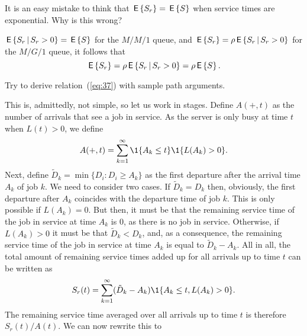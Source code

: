 \begin{question}
  It is an easy mistake to think that $\,\mathsf{E}\left\{S_r\right\} = \,\mathsf{E}\left\{S\right\}$ when service
  times are exponential. Why is this wrong?
  \begin{solution}
    $\,\mathsf{E}\left\{S_r \,\middle|\, S_r>0\right\} = \,\mathsf{E}\left\{S\right\}$ for the $M/M/1$ queue, and
    $\,\mathsf{E}\left\{S_r\right\} = \rho \,\mathsf{E}\left\{S_r \,\middle|\, S_r>0\right\}$ for the $M/G/1$ queue, it
    follows that
  \begin{equation*}
 \,\mathsf{E}\left\{S_r\right\} = \rho \,\mathsf{E}\left\{S_r\,\middle|\, S_r>0\right\} = \rho \,\mathsf{E}\left\{S\right\}.
  \end{equation*}
  \end{solution}
\end{question}

\begin{question}
  Try to derive relation~(\ref{eq:37}) with sample path
  arguments. 
  \begin{solution}
    This is, admittedly, not simple, so let us work in stages. Define
    $A(+,t)$ as the number of arrivals that see a job in service. As
    the server is only busy at time $t$ when $L(t)>0$, we define
    \begin{equation*}
      A(+,t) = \sum_{k=1}^\infty \1{A_k\leq t}\1{L(A_k) > 0}.
    \end{equation*}
    Next, define $\tilde D_k = \min\{D_i: D_i \geq A_k\}$ as the first
    departure after the arrival time $A_k$ of job $k$. We need to
    consider two cases. If $\tilde D_k = D_k$ then, obviously, the
    first departure after $A_k$ coincides with the departure time of
    job $k$. This is only possible if $L(A_k) = 0$. But then, it must
    be that the remaining service time of the job in service at time
    $A_k$ is 0, as there is no job in service. Otherwise, if
    $L(A_k)>0$ it must be that $\tilde D_k < D_k$, and, as a
    consequence, the remaining service time of the job in service at
    time $A_k$ is equal to $\tilde D_k - A_k$. All in all, the total
    amount of remaining service times added up for all arrivals up to
    time $t$ can be written as
    \begin{equation*}
      S_r(t) = \sum_{k=1}^\infty (\tilde D_k - A_k) \1{A_k \leq t, L(A_k) > 0}.
    \end{equation*}
    The remaining service time averaged over all arrivals up to
    time $t$ is therefore $S_r(t)/A(t)$. We can now rewrite this to
\begin{equation*}

\end{equation*}
\end{solution}
\end{question}

